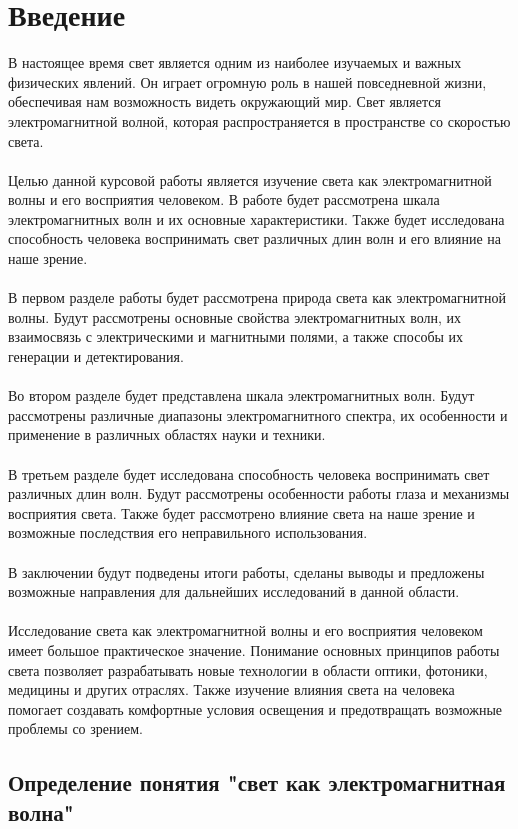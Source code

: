 \documentclass{article}
\begin{document}
\section{Введение}
В настоящее время свет является одним из наиболее изучаемых и важных физических явлений. Он играет огромную роль в нашей повседневной жизни, обеспечивая нам возможность видеть окружающий мир. Свет является электромагнитной волной, которая распространяется в пространстве со скоростью света.\\
~\\
Целью данной курсовой работы является изучение света как электромагнитной волны и его восприятия человеком. В работе будет рассмотрена шкала электромагнитных волн и их основные характеристики. Также будет исследована способность человека воспринимать свет различных длин волн и его влияние на наше зрение.\\
~\\
В первом разделе работы будет рассмотрена природа света как электромагнитной волны. Будут рассмотрены основные свойства электромагнитных волн, их взаимосвязь с электрическими и магнитными полями, а также способы их генерации и детектирования.\\
~\\
Во втором разделе будет представлена шкала электромагнитных волн. Будут рассмотрены различные диапазоны электромагнитного спектра, их особенности и применение в различных областях науки и техники.\\
~\\
В третьем разделе будет исследована способность человека воспринимать свет различных длин волн. Будут рассмотрены особенности работы глаза и механизмы восприятия света. Также будет рассмотрено влияние света на наше зрение и возможные последствия его неправильного использования.\\
~\\
В заключении будут подведены итоги работы, сделаны выводы и предложены возможные направления для дальнейших исследований в данной области.\\
~\\
Исследование света как электромагнитной волны и его восприятия человеком имеет большое практическое значение. Понимание основных принципов работы света позволяет разрабатывать новые технологии в области оптики, фотоники, медицины и других отраслях. Также изучение влияния света на человека помогает создавать комфортные условия освещения и предотвращать возможные проблемы со зрением.
\subsection{Определение понятия "{}{}свет как электромагнитная волна"{}{}}
\end{document}
